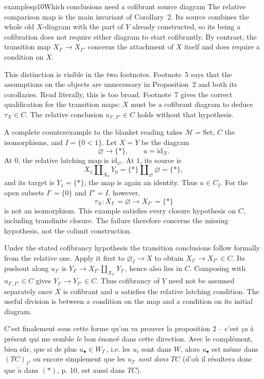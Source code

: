 \begin{dcomment}{examples}{p10}{Which conclusions need a cofibrant source diagram}
The relative comparison map is the main invariant of Corollary~2. Its source combines the whole old $X$-diagram with the part of $Y$ already constructed, so its being a cofibration does not require either diagram to start cofibrantly. By contrast, the transition map $X_{I'}\to X_{I''}$ concerns the attachment of $X$ itself and does require a condition on $X$.

This distinction is visible in the two footnotes. Footnote~5 says that the assumptions on the objects are unnecessary in Proposition~2 and both its corollaries. Read literally, this is too broad. Footnote~7 gives the correct qualification for the transition maps: $X$ must be a cofibrant diagram to deduce $\tau_X\in C$. The relative conclusion $u_{I',I''}\in C$ holds without that hypothesis.

A complete counterexample to the blanket reading takes $\mathcal M=\mathrm{Set}$, $C$ the isomorphisms, and $I=\{0<1\}$. Let $X=Y$ be the diagram
\[
 \varnothing\longrightarrow\{*\},\qquad u=\mathrm{id}_X.
\]
At $0$, the relative latching map is $\mathrm{id}_{\varnothing}$. At $1$, its source is
\[
 X_1\amalg_{X_0}Y_0=\{*\}\amalg_{\varnothing}\varnothing=\{*\},
\]
and its target is $Y_1=\{*\}$; the map is again an identity. Thus $u\in C_I$. For the open subsets $I'=\{0\}$ and $I''=I$, however,
\[
 \tau_X:X_{I'}=\varnothing\longrightarrow X_{I''}=\{*\}
\]
is not an isomorphism. This example satisfies every closure hypothesis on $C$, including transfinite closure. The failure therefore concerns the missing hypothesis, not the colimit construction.

Under the stated cofibrancy hypothesis the transition conclusions follow formally from the relative one. Apply it first to $\varnothing_I\to X$ to obtain $X_{I'}\to X_{I''}\in C$. Its pushout along $u_{I'}$ is $Y_{I'}\to X_{I''}\amalg_{X_{I'}}Y_{I'}$, hence also lies in $C$. Composing with $u_{I',I''}\in C$ gives $Y_{I'}\to Y_{I''}\in C$. Thus cofibrancy of $Y$ need not be assumed separately once $X$ is cofibrant and $u$ satisfies the relative latching condition. The useful division is between a condition on the map and a condition on its initial diagram.
\end{dcomment}


C'est finalement sous cette forme qu'on va prouver la proposition 2 -- c'est \textit{ça} à présent qui me semble \textit{le} bon énoncé dans cette direction. Avec le complément, bien sûr, que si de plus $u_{\bullet} \in W_{I^{\circ}}$, i.e. les $u_i$ sont dans $W$, alors $u_{\bullet}$ est même dans $(TC)_I$, ou encore
simplement que les $u_{I'}$ \textit{sont dans} $TC$ (d'où il résultera donc que $\tilde{u}$ dans $(*)$, p. 10, est aussi dans $TC$).

